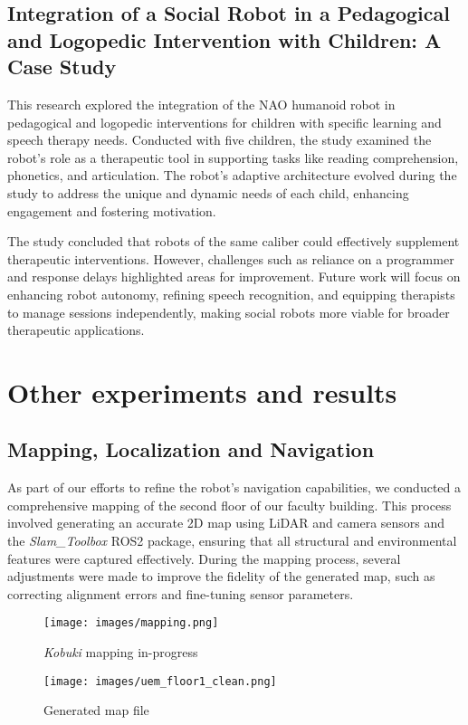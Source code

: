 \documentclass[runningheads,a4paper]{llncs}
\begin{document}
\subsection{Integration of a Social Robot in a Pedagogical and Logopedic Intervention with Children: A Case Study}
This research explored the integration of the NAO humanoid robot in pedagogical and logopedic interventions for children with specific learning and speech therapy needs. Conducted with five children, the study examined the robot's role as a therapeutic tool in supporting tasks like reading comprehension, phonetics, and articulation. The robot’s adaptive architecture evolved during the study to address the unique and dynamic needs of each child, enhancing engagement and fostering motivation.

The study concluded that robots of the same caliber could effectively supplement therapeutic interventions. However, challenges such as reliance on a programmer and response delays highlighted areas for improvement. Future work will focus on enhancing robot autonomy, refining speech recognition, and equipping therapists to manage sessions independently, making social robots more viable for broader therapeutic applications.\cite{corrales2020embodiment}

\section{Other experiments and results}

\subsection{Mapping, Localization and Navigation}
As part of our efforts to refine the robot's navigation capabilities, we conducted a comprehensive mapping of the second floor of our faculty building. This process involved generating an accurate 2D map using LiDAR and camera sensors and the \textit{Slam\_Toolbox} ROS2 package, ensuring that all structural and environmental features were captured effectively. During the mapping process, several adjustments were made to improve the fidelity of the generated map, such as correcting alignment errors and fine-tuning sensor parameters.
\begin{figure}[H]
    \centering
    \begin{minipage}{0.4\textwidth}
        \centering
        \texttt{[image: images/mapping.png]}
        \caption{\textit{Kobuki} mapping in-progress}
        \label{fig:mapping}
    \end{minipage}
    \hfill
    \begin{minipage}{0.4\textwidth}
        \centering
        \texttt{[image: images/uem\_floor1\_clean.png]}
        \caption{Generated map file}
        \label{fig:uem_floor1_clean}
    \end{minipage}
\end{figure}
\end{document}
